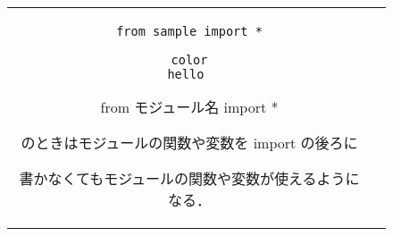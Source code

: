 \documentclass{jsarticle}
\begin{document}
\begin{figure}[h]
	\begin{tabular}{cc}
		\begin{minipage}[t]{.4\textwidth}
			\begin{lstlisting}[caption=インポートの仕方-その4]
from sample import *

color
hello \end{lstlisting}
		\end{minipage} \hspace{5mm}
		\begin{minipage}[t]{.6\textwidth}
			\begin{screen}
				from モジュール名 import * \par
				のときはモジュールの関数や変数を import の後ろに\par 書かなくてもモジュールの関数や変数が使えるようになる．
			\end{screen}
		\end{minipage}
	\end{tabular}
\end{figure}


\end{document}
